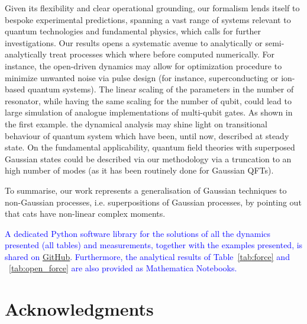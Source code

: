\documentclass[%
reprint,
superscriptaddress,
nofootinbib,
 amsmath,amssymb,
prx,
floatfix,
]{revtex4-2}
\begin{document}
Given its flexibility and clear operational grounding, our formalism lends itself to bespoke experimental predictions, spanning a vast range of systems relevant to quantum technologies and fundamental physics, which calls for further investigations. Our results opens a systematic avenue to analytically or semi-analytically treat processes which where before computed numerically. For instance, the open-driven dynamics may allow for optimization procedure to minimize unwanted noise via pulse design (for instance, superconducting or ion-based quantum systems). The linear scaling of the parameters in the number of resonator, while having the same scaling for the number of qubit, could lead to large simulation of analogue implementations of multi-qubit gates. As shown in the first example. the dynamical analysis may shine light on transitional behaviour of quantum system which have been, until now, described at steady state. On the fundamental applicability, quantum field theories with superposed Gaussian states could be described via our methodology via a truncation to an high number of modes (as it has been routinely done for Gaussian QFTs). 

To summarise, our work represents a generalisation of Gaussian techniques to non-Gaussian processes, i.e. superpositions of Gaussian processes, by pointing out that cats have non-linear complex moments. 


\textcolor{blue}{
A dedicated Python software library for the solutions of all the dynamics presented (all tables) and measurements, together with the examples presented, is shared on \href{https://github.com/LorenzoBracciniUCL/GBCS}{GitHub}. Furthermore, the analytical results of Table~\ref{tab:force} and ~\ref{tab:open_force} are also provided as Mathematica Notebooks. }








\section{Acknowledgments}
\end{document}
